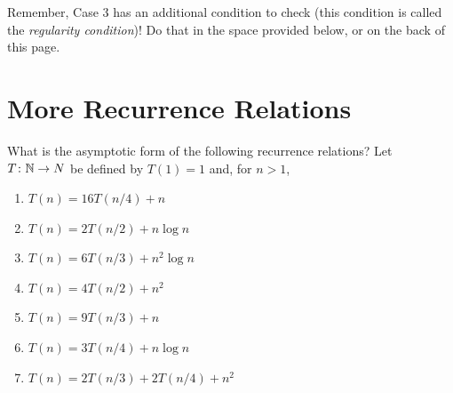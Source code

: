 \documentclass{article}
\begin{document}
Remember, Case 3 has an additional condition to check (this condition
is called the
\emph{regularity condition})! Do that in the space
provided below, or on the back of this page.


\newpage
\section*{More Recurrence Relations}

What is the asymptotic form of the following recurrence
relations?
Let $T \colon {\mathbb N} \to N$ be defined by $T(1)=1$ and, for $n>1$,
\begin{enumerate}
    \item $T(n) = 16 T(n/4) + n$
        \practice
    \item $T(n) = 2 T(n/2) + n \log{n}$
        \practice
    \item $T(n) = 6 T(n/3) + n^2 \log{n}$
        \practice
    \item $T(n) = 4 T(n/2) + n^2$
        \practice
    \item $T(n) = 9 T(n/3) + n$
        \practice
    \item $T(n) = 3 T(n/4) + n\log n$
        \practice
    \item $T(n) = 2 T(n/3) + 2 T(n/4) + n^2$
        \practice
\end{enumerate}
\end{document}
